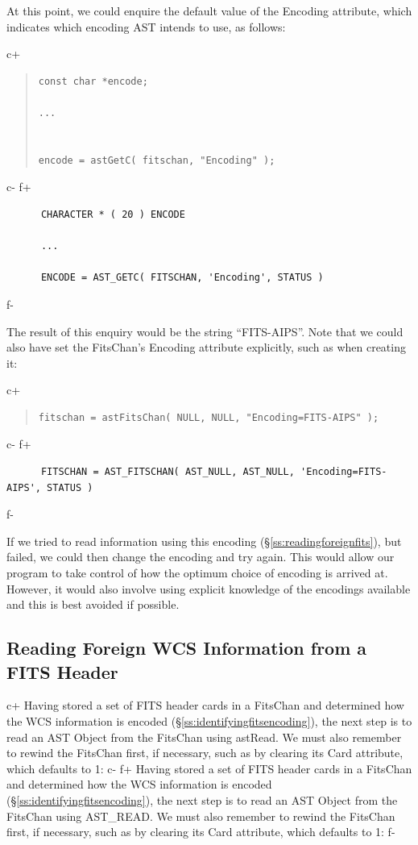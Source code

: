 \documentclass[twoside,11pt]{article}
\newcommand{\secref}[1]{\S\ref{#1}}
\newcommand{\secref}[1]{\ref{#1}}
\begin{document}
At this point, we could enquire the default value of the Encoding
attribute, which indicates which encoding AST intends to use, as
follows:

c+
\begin{quote}
\small
\begin{verbatim}
const char *encode;

...


encode = astGetC( fitschan, "Encoding" );
\end{verbatim}
\normalsize
\end{quote}
c-
f+
\small
\begin{verbatim}
      CHARACTER * ( 20 ) ENCODE

      ...

      ENCODE = AST_GETC( FITSCHAN, 'Encoding', STATUS )
\end{verbatim}
\normalsize
f-

The result of this enquiry would be the string ``FITS-AIPS''.  Note
that we could also have set the FitsChan's Encoding attribute
explicitly, such as when creating it:

c+
\begin{quote}
\small
\begin{verbatim}
fitschan = astFitsChan( NULL, NULL, "Encoding=FITS-AIPS" );
\end{verbatim}
\normalsize
\end{quote}
c-
f+
\small
\begin{verbatim}
      FITSCHAN = AST_FITSCHAN( AST_NULL, AST_NULL, 'Encoding=FITS-AIPS', STATUS )
\end{verbatim}
\normalsize
f-

If we tried to read information using this encoding
(\secref{ss:readingforeignfits}), but failed, we could then change the
encoding and try again.  This would allow our program to take control
of how the optimum choice of encoding is arrived at. However, it would
also involve using explicit knowledge of the encodings available and
this is best avoided if possible.

\subsection{\label{ss:readingforeignfits}Reading Foreign WCS Information from a FITS Header}

c+
Having stored a set of FITS header cards in a FitsChan and determined
how the WCS information is encoded
(\secref{ss:identifyingfitsencoding}), the next step is to read an AST
Object from the FitsChan using astRead. We must also remember to
rewind the FitsChan first, if necessary, such as by clearing its Card
attribute, which defaults to 1:
c-
f+
Having stored a set of FITS header cards in a FitsChan and determined
how the WCS information is encoded
(\secref{ss:identifyingfitsencoding}), the next step is to read an AST
Object from the FitsChan using AST\_READ. We must also remember to
rewind the FitsChan first, if necessary, such as by clearing its Card
attribute, which defaults to 1:
f-
\end{document}
